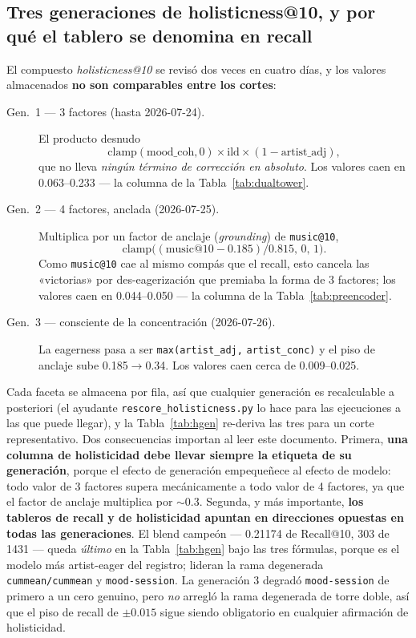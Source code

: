\documentclass[11pt]{article}
\begin{document}
\subsection{Tres generaciones de holisticness@10, y por qué el tablero se denomina en recall}
\label{sec:power-generations}
El compuesto \emph{holisticness@10} se revisó dos veces en cuatro días, y los
valores almacenados \textbf{no son comparables entre los cortes}:
\begin{description}
  \item[Gen.\ 1 --- 3 factores (hasta 2026-07-24).] El producto desnudo
  \[\mathrm{clamp}(\text{mood\_coh},0)\times\text{ild}\times(1-\text{artist\_adj}),\]
  que no lleva \emph{ningún término de corrección en absoluto}. Los valores caen
  en \numrange{0.063}{0.233} --- la columna de la Tabla~\ref{tab:dualtower}.
  \item[Gen.\ 2 --- 4 factores, anclada (2026-07-25).] Multiplica por un factor
  de anclaje (\emph{grounding}) de \texttt{music@10},
  \[\mathrm{clamp}\bigl((\text{music@10}-\num{0.185})/\num{0.815},\,0,\,1\bigr).\]
  Como \texttt{music@10} cae al mismo compás que el recall, esto cancela las
  «victorias» por des-eagerización que premiaba la forma de 3 factores; los
  valores caen en \numrange{0.044}{0.050} --- la columna de la
  Tabla~\ref{tab:preencoder}.
  \item[Gen.\ 3 --- consciente de la concentración (2026-07-26).] La eagerness
  pasa a ser \texttt{max(artist\_adj,} \texttt{artist\_conc)} y el piso de
  anclaje sube \num{0.185}$\to$\num{0.34}. Los valores caen cerca de
  \numrange{0.009}{0.025}.
\end{description}
Cada faceta se almacena por fila, así que cualquier generación es recalculable a
posteriori (el ayudante \texttt{rescore\_holisticness.py} lo hace para las
ejecuciones a las que puede llegar), y la Tabla~\ref{tab:hgen} re-deriva las tres
para un corte representativo. Dos consecuencias importan al leer este documento.
Primera, \textbf{una columna de holisticidad debe llevar siempre la etiqueta de su
generación}, porque el efecto de generación empequeñece al efecto de modelo: todo
valor de 3 factores supera mecánicamente a todo valor de 4 factores, ya que el
factor de anclaje multiplica por ${\sim}0.3$. Segunda, y más importante,
\textbf{los tableros de recall y de holisticidad apuntan en direcciones opuestas
en todas las generaciones}. El blend campeón --- \num{0.21174} de Recall@10,
\num{303} de \num{1431} --- queda \emph{último} en la Tabla~\ref{tab:hgen} bajo
las tres fórmulas, porque es el modelo más artist-eager del registro; lideran la
rama degenerada \texttt{cummean/cummean} y \texttt{mood-session}. La generación 3
degradó \texttt{mood-session} de primero a un cero genuino, pero \emph{no}
arregló la rama degenerada de torre doble, así que el piso de recall de
$\pm\num{0.015}$ sigue siendo obligatorio en cualquier afirmación de
holisticidad.
\end{document}
